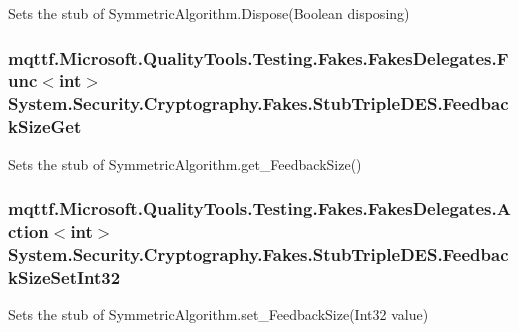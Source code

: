 Sets the stub of Symmetric\-Algorithm.\-Dispose(\-Boolean disposing)

\hypertarget{class_system_1_1_security_1_1_cryptography_1_1_fakes_1_1_stub_triple_d_e_s_a2ac676f643c7fc041aab2c87e410f3c7}{
\subsubsection[{Feedback\-Size\-Get}]{\setlength{\rightskip}{0pt plus 5cm}mqttf.\-Microsoft.\-Quality\-Tools.\-Testing.\-Fakes.\-Fakes\-Delegates.\-Func$<$int$>$ System.\-Security.\-Cryptography.\-Fakes.\-Stub\-Triple\-D\-E\-S.\-Feedback\-Size\-Get}}\label{class_system_1_1_security_1_1_cryptography_1_1_fakes_1_1_stub_triple_d_e_s_a2ac676f643c7fc041aab2c87e410f3c7}


Sets the stub of Symmetric\-Algorithm.\-get\-\_\-\-Feedback\-Size()

\hypertarget{class_system_1_1_security_1_1_cryptography_1_1_fakes_1_1_stub_triple_d_e_s_a7cb94a55d067b5e3e852ef1f208bcd23}{
\subsubsection[{Feedback\-Size\-Set\-Int32}]{\setlength{\rightskip}{0pt plus 5cm}mqttf.\-Microsoft.\-Quality\-Tools.\-Testing.\-Fakes.\-Fakes\-Delegates.\-Action$<$int$>$ System.\-Security.\-Cryptography.\-Fakes.\-Stub\-Triple\-D\-E\-S.\-Feedback\-Size\-Set\-Int32}}\label{class_system_1_1_security_1_1_cryptography_1_1_fakes_1_1_stub_triple_d_e_s_a7cb94a55d067b5e3e852ef1f208bcd23}


Sets the stub of Symmetric\-Algorithm.\-set\-\_\-\-Feedback\-Size(\-Int32 value)


